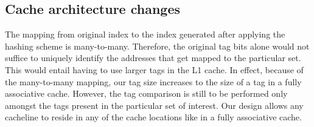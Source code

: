 \subsection{Cache architecture changes}
The mapping from original index to the index generated after applying the hashing scheme is many-to-many. Therefore, the original tag bits alone would not suffice to uniquely identify the addresses that get mapped to the particular set. This would entail having to use larger tags in the L1 cache. In effect, because of the many-to-many mapping, our tag size increases to the size of a tag in a fully associative cache. However, the tag comparison is still to be performed only amongst the tags present in the particular set of interest. Our design allows any cacheline to reside in any of the cache locations like in a fully associative cache.  

